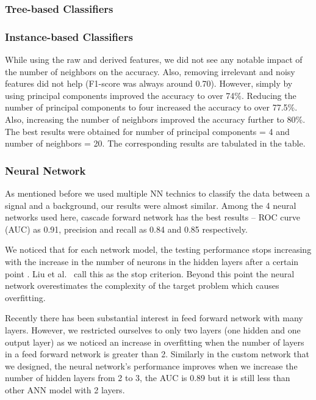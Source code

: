 \subsubsection{Tree-based Classifiers}

\subsubsection{Instance-based Classifiers}

While using the raw and derived features, we did not see any notable impact of the number of neighbors on the accuracy. Also, removing irrelevant and noisy features did not help (F1-score was always around 0.70). However, simply by using principal components improved the accuracy to over 74\%. Reducing the number of principal components to four increased the accuracy to over 77.5\%. Also, increasing the number of neighbors improved the accuracy further to 80\%. The best results were obtained for number of principal components = 4 and number of neighbors = 20. The corresponding results are tabulated in the table.

\subsubsection{Neural Network}
As mentioned before we used multiple NN technics to classify the data between a signal and a background, our results were almost similar. Among the 4 neural networks used here, cascade forward network has the best results --  ROC curve (AUC) as 0.91, precision and recall as 0.84 and 0.85 respectively.  

We noticed that for each network model, the testing performance stops increasing with the increase in the number of neurons in the hidden layers after a certain point . Liu et al.~\cite{NN-Result} call this as the stop criterion. Beyond this point the neural network overestimates the complexity of the target problem which causes overfitting.

Recently there has been substantial interest in feed forward network with many layers. However, we restricted ourselves to only two layers (one hidden and one output layer) as we noticed an increase in overfitting when the number of layers in a feed forward network is greater than 2.  Similarly in the custom network that we designed, the neural network's performance improves when we increase the number of hidden layers from 2 to 3, the AUC is 0.89 but it is still less than other ANN model with 2 layers. 


